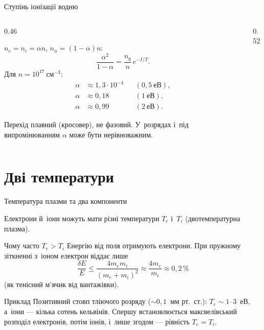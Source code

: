 \documentclass[]{beamer}
\newcommand{\figw}[1]{\resizebox{\linewidth}{!}{\begin{minipage}{11cm}\centering\end{minipage}}}
\newcommand{\cm}{\mathrm{см}}
\begin{document}
\begin{frame}{Ступінь іонізації водню}
	\begin{columns}[T]
		\begin{column}{0.46\linewidth}
			\begin{block}{}\justifying\scriptsize
				$n_e=n_i=\alpha n$, $n_n=(1-\alpha)n$:
				\begin{equation*}
					\frac{\alpha^2}{1-\alpha}=\frac{n_q}{n}\,e^{-I/T}.
				\end{equation*}
				Для $n=10^{17}~\cm^{-3}$:
				\begin{equation*}
					\begin{aligned}
						\alpha&\approx1{,}3\cdot10^{-4}&&(0{,}5~\text{еВ}),\\
						\alpha&\approx0{,}18&&(1~\text{еВ}),\\
						\alpha&\approx0{,}99&&(2~\text{еВ}).
					\end{aligned}
				\end{equation*}
			\end{block}
			\begin{alertblock}{}\justifying\scriptsize
				Перехід \alert{плавний} (кросовер), не фазовий. У~розрядах і~під випромінюванням $\alpha$ може бути
				нерівноважним.
			\end{alertblock}
		\end{column}
		\begin{column}{0.52\linewidth}
			\figw{saha-curve.tikz}
		\end{column}
	\end{columns}
\end{frame}

\section{Дві температури}

\begin{frame}{Температура плазми та два компоненти}
	\begin{block}{}\justifying\small
		Електрони й~іони можуть мати різні температури $T_e$ і~$T_i$ (\alert{двотемпературна плазма}).
	\end{block}
	\begin{block}{Чому часто $T_e>T_i$}\justifying\small
		Енергію від поля отримують електрони. При пружному зіткненні з~іоном електрон віддає лише
		\begin{equation*}
			\frac{\delta E}{E}\le\frac{4m_em_i}{(m_e+m_i)^2}\approx\frac{4m_e}{m_i}\approx0{,}2\,\%
		\end{equation*}
		(як тенісний м'ячик від вантажівки).
	\end{block}
	\begin{exampleblock}{Приклад}\justifying\small
		Позитивний стовп тліючого розряду ($\sim0{,}1$~мм рт.~ст.): $T_e\sim1$--$3$~еВ, а~іони --- кілька сотень кельвінів.
		Спершу встановлюється максвелівський розподіл електронів, потім іонів, і~лише згодом --- рівність $T_e=T_i$.
	\end{exampleblock}
\end{frame}
\end{document}
